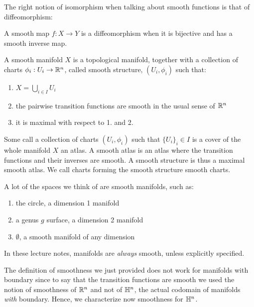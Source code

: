 \noindent The right notion of isomorphism when talking about smooth functions is that of diffeomorphism:
\begin{defn}[Diffeomorphism]
    A smooth map $f:X\rightarrow Y$ is a diffeomorphism when it is bijective and has a smooth inverse map.
\end{defn}

\begin{defn}
    A smooth manifold $X$ is a topological manifold, together with a collection of charts $\phi_i:U_i\to\mathbb{R}^n$, called smooth structure, $(U_i, \phi_i)$ such that:
    \begin{enumerate}
        \item $X = \bigcup_{i\in I} U_i$
        \item the pairwise transition functions are smooth in the usual sense of $\mathbb{R}^n$
        \item it is maximal with respect to 1. and 2.
    \end{enumerate}
 Some call a collection of charts $(U_i, \phi_i)$ such that $\{U_i\}_i\in I$ is a cover of the whole manifold $X$ an atlas. A smooth atlas is an atlas where the transition functions and their inverses are smooth. A smooth structure is thus a maximal smooth atlas. We call charts forming the smooth structure smooth charts.
\end{defn}

\begin{ex}
    A lot of the spaces we think of are smooth manifolds, such as:
    \begin{enumerate}
        \item the circle, a dimension 1 manifold
        \item a genus $g$ surface, a dimension 2 manifold
        \item $\emptyset$, a smooth manifold of any dimension
    \end{enumerate}
\end{ex}
\begin{notat}
    In these lecture notes, manifolds are \textit{always} smooth, unless explicitly specified.
\end{notat}
\begin{rem}
    The definition of smoothness we just provided does not work for manifolds with boundary since to say that the transition functions are smooth we used the notion of smoothness of $\mathbb{R}^n$ and not of $\mathbb{H}^n$, the actual codomain of manifolds \emph{with} boundary. Hence, we characterize now smoothness for $\mathbb{H}^n$.
\end{rem}

